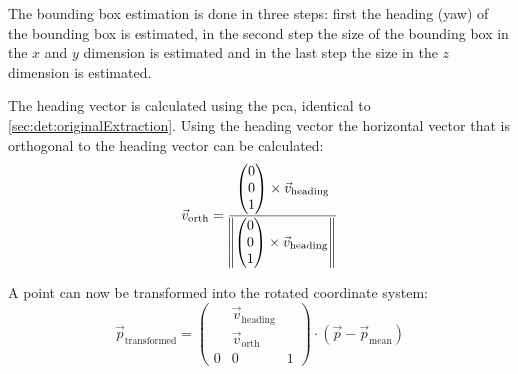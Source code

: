 The bounding box estimation is done in three steps: first the heading (yaw) of the bounding box is estimated, in the second step the size of the bounding box in the $x$ and $y$ dimension is estimated and in the last step the size in the $z$ dimension is estimated.

The heading vector is calculated using the \ac{pca}, identical to \ref{sec:det:originalExtraction}.
Using the heading vector the horizontal vector that is orthogonal to the heading vector can be calculated:
\begin{equation}
    \vec{v}_\text{orth} =
        \normalize{
            \begin{pmatrix}
                0 \\ 0 \\ 1
            \end{pmatrix}
            \times \vec{v}_\text{heading}
        }
\end{equation}

A point can now be transformed into the rotated coordinate system:
\begin{equation}
    \vec{p}_\text{transformed} =
        \begin{pmatrix}
            & \vec{v}_\text{heading} & \\ & \vec{v}_\text{orth} & \\ 0 & 0 & 1
        \end{pmatrix}
        \cdot \left( \vec{p} - \vec{p}_\text{mean} \right)
\end{equation}

